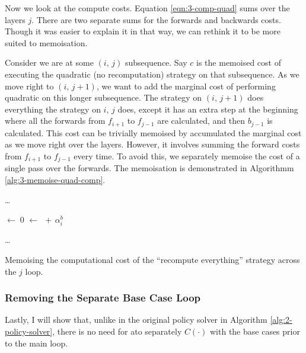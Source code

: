 Now we look at the compute costs.
Equation \ref{eqn:3-comp-quad} sums over the layers \(j\).
There are two separate sums for the forwards and backwards costs.
Though it was easier to explain it in that way, we can rethink it to be more suited to memoisation.

Consider we are at some \((i,\, j)\) subsequence.
Say \(c\) is the memoised cost of executing the quadratic (no recomputation) strategy on that subsequence.
As we move right to \((i,\, j+1)\), we want to add the marginal cost of performing quadratic on this longer subsequence.
The strategy on \((i,\,j+1)\) does everything the strategy on \(i,\,j\) does, except it has an extra step at the beginning where all the forwards from \(f_{i+1}\) to \(f_{j-1}\) are calculated, and then \(b_{j-1}\) is calculated.
This cost can be trivially memoised by accumulated the marginal cost as we move right over the layers.
However, it involves summing the forward costs from \(f_{i+1}\) to \(f_{j-1}\) every time.
To avoid this, we separately memoise the cost of a single pass over the forwards.
The memoisation is demonstrated in Algorithmm \ref{alg:3-memoise-quad-comp}.

\begin{algorithm}[htb]
    \DontPrintSemicolon

    \ldots\;
    \BlankLine

    \ComputeF \(\leftarrow\; 0\)\;
    \ComputeQuad \(\leftarrow\;\)\ComputeF\(\,+\, \alpha^b_i\)\;
    \BlankLine

    \ldots\;
    \caption{Memoising the computational cost of the ``recompute everything'' strategy across the \(j\) loop.}
    \label{alg:3-memoise-quad-comp}
\end{algorithm}

\subsubsection*{Removing the Separate Base Case Loop}
Lastly, I will show that, unlike in the original policy solver in Algorithm \ref{alg:2-policy-solver}, there is no need for ato separately \(C(\cdot)\) with the base cases prior to the main loop.

